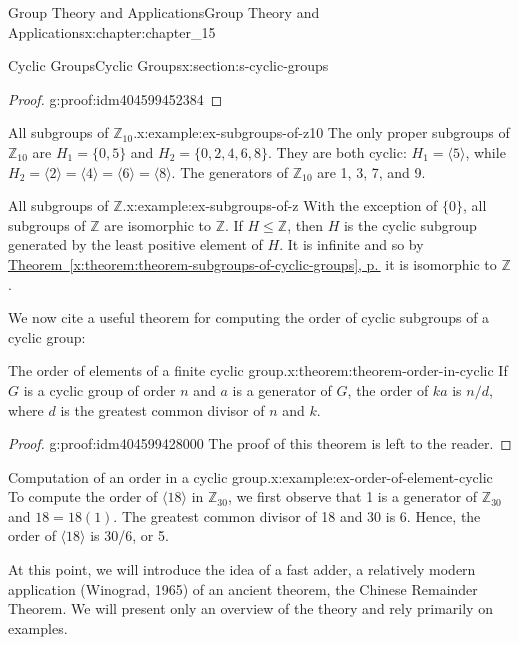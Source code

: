 \documentclass[twoside,10pt,]{book}
\newcommand{\xreffont}{\relax}
\numberwithin{equation}{section}
\begin{document}
\begin{chapterptx}{Group Theory and Applications}{}{Group Theory and Applications}{}{}{x:chapter:chapter_15}
\begin{sectionptx}{Cyclic Groups}{}{Cyclic Groups}{}{}{x:section:s-cyclic-groups}
\begin{proof}{}{g:proof:idm404599452384}
\end{proof}
\begin{example}{All subgroups of \(\mathbb{Z}_{10}\).}{x:example:ex-subgroups-of-z10}%
The only proper subgroups of \(\mathbb{Z}_{10}\) are \(H_1 = \{0, 5\}\) and \(H_2 = \{0, 2, 4, 6, 8\}\).  They are both cyclic: \(H_1= \langle 5 \rangle\), while \(H_2 = \langle 2 \rangle = \langle 4 \rangle = \langle 6 \rangle = \langle 8 \rangle\). The generators of \(\mathbb{Z}_{10}\) are 1, 3, 7, and 9.%
\end{example}
\begin{example}{All subgroups of \(\mathbb{Z}\).}{x:example:ex-subgroups-of-z}%
With the exception of \(\{0\}\), all subgroups of \(\mathbb{Z}\) are isomorphic to \(\mathbb{Z}\).  If \(H \leq  \mathbb{Z}\), then \(H\) is the cyclic subgroup generated by the least positive element of \(H\).  It is infinite and so by \hyperref[x:theorem:theorem-subgroups-of-cyclic-groups]{Theorem~{\xreffont\ref{x:theorem:theorem-subgroups-of-cyclic-groups}}, p.\,\pageref{x:theorem:theorem-subgroups-of-cyclic-groups}} it is isomorphic to \(\mathbb{Z}\).%
\end{example}
We now cite a useful theorem for computing the order of cyclic subgroups of a cyclic group:%
\begin{theorem}{The order of elements of a finite cyclic group.}{}{x:theorem:theorem-order-in-cyclic}%
%
If \(G\) is a cyclic group of order \(n\) and \(a\) is a generator of \(G\), the order of \(k a\) is \(n/d\), where \(d\) is the greatest common divisor of \(n\) and \(k\).%
\end{theorem}
\begin{proof}{}{g:proof:idm404599428000}
The proof of this theorem is left to the reader.%
\end{proof}
\begin{example}{Computation of an order in a cyclic group.}{x:example:ex-order-of-element-cyclic}%
To compute the order of \(\langle 18 \rangle\) in \(\mathbb{Z}_{30}\), we first observe that 1 is a generator of \(\mathbb{Z}_{30}\)  and \(18= 18(1)\). The greatest common divisor of 18 and 30 is 6. Hence, the order of \(\langle 18 \rangle\) is 30\slash{}6, or 5.%
\end{example}
At this point, we will introduce the idea of a fast adder, a relatively modern application (Winograd, 1965) of an ancient theorem, the Chinese Remainder Theorem. We will present only an overview of the theory and rely primarily on examples.%
\par

\end{sectionptx}
\end{chapterptx}
\end{document}

